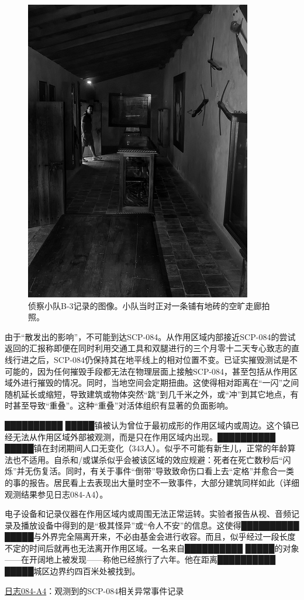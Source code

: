 \begin{figure}[H]
    \centering
    \includegraphics[width=0.5\linewidth]{images/SCP-084-2.jpg}
    \caption*{侦察小队B-3记录的图像。小队当时正对一条铺有地砖的空旷走廊拍照。}
\end{figure}

由于“散发出的影响”，不可能到达SCP-084。从作用区域内部接近SCP-084的尝试返回的汇报称即便在同时利用交通工具和双腿进行的三个月零十二天专心致志的直线行进之后，SCP-084仍保持其在地平线上的相对位置不变。已证实摧毁测试是不可能的，因为任何摧毁手段都无法在物理层面上接触SCP-084，甚至包括从作用区域外进行摧毁的情况。同时，当地空间会定期扭曲。这使得相对距离在“一闪”之间随机延长或缩短，导致建筑或物体突然“跳”到几千米之外，或“冲”到其它地点，有时甚至导致“重叠”。这种“重叠”对活体组织有显著的负面影响。

██████████ █████镇被认为曾位于最初成形的作用区域内或周边。这个镇已经无法从作用区域外部被观测，而是只在作用区域内出现。██████████ █████镇在封闭期间人口无变化（343人）。似乎不可能有新生儿，正常的年龄算法也不适用。自杀和\slash 或谋杀似乎会被该区域的效应规避：死者在死亡数秒后“闪烁”并无伤复活。同时，有关于事件“倒带”导致致命伤口看上去“定格”并愈合一类的事的报告。居民看上去表现出大量时空不一致事件，大部分建筑同样如此（详细观测结果参见日志084-A4）。

电子设备和记录仪器在作用区域内或周围无法正常运转。实验者报告从视、音频记录及播放设备中得到的是“极其怪异”或“令人不安”的信息。这使得██████████ █████与外界完全隔离开来，不必由基金会进行收容。而且，似乎经过一段长度不定的时间后就再也无法离开作用区域。一名来自██████████ █████的对象——在开阔地上被发现——称他已经旅行了六年。他在距离██████████ █████城区边界约四百米处被找到。

\hr

\hyperref[sec:DOC-log-084-a4]{日志084-A4}：观测到的SCP-084相关异常事件记录

\hr

\newpage

